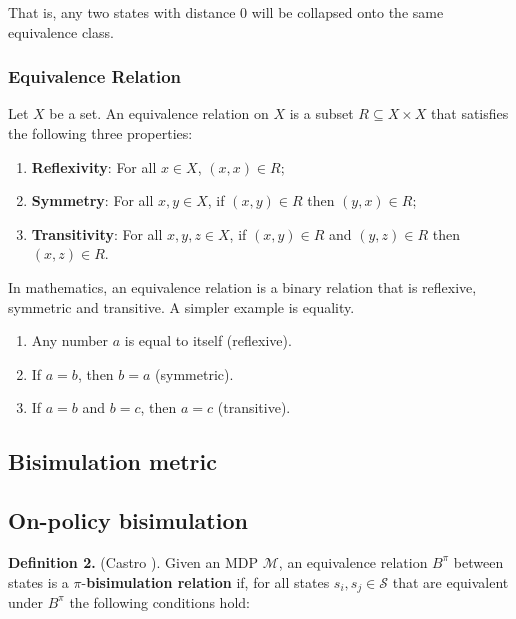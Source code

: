 That is, any two states with distance 0 will be collapsed onto the same equivalence class.

\subsubsection{Equivalence Relation}

\begin{definition}
Let $X$ be a set. An equivalence relation on $X$ is a subset $R \subseteq X \times X$ that satisfies the following three properties:
\begin{enumerate}
    \item \textbf{Reflexivity}: For all $x \in X$, $(x,x) \in R$;
    \item \textbf{Symmetry}: For all $x, y \in X$, if $(x,y) \in R$ then $(y,x) \in R$;
    \item \textbf{Transitivity}: For all $x, y, z \in X$, if $(x,y) \in R$ and $(y,z) \in R$ then $(x,z) \in R$.
\end{enumerate}
\end{definition}

In mathematics, an equivalence relation is a binary relation that is reflexive, symmetric and transitive. A simpler example is equality. 

\begin{enumerate}
    \item Any number $a$ is equal to itself (reflexive).
    \item  If $a=b$, then $b=a$ (symmetric).
    \item If $a=b$ and $b=c$, then $a=c$ (transitive). 
\end{enumerate}

\subsection{Bisimulation metric}

\subsection{On-policy bisimulation}

\textbf{Definition 2.} (Castro \cite{castro2020scalable}). Given an MDP $\mathcal{M}$, an equivalence relation $B^\pi$ between states is a $\pi$-\textbf{bisimulation relation} if, for all states $s_i, s_j \in \mathcal{S}$ that are equivalent under $B^\pi$ the following conditions hold:

